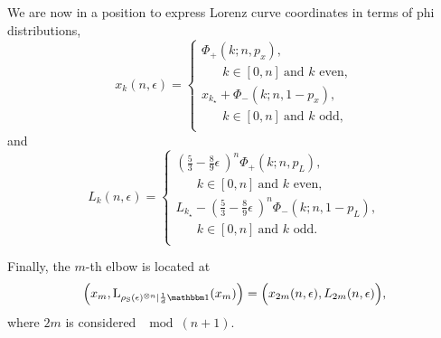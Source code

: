 \documentclass[pra,
aps,
twocolumn,
superscriptaddress,
groupedaddress,
nofootinbib,
reprint
]{revtex4-1}
\begin{document}
We are now in a position to express Lorenz curve coordinates in terms of phi distributions,
\begin{equation}\label{x_coord_elb}
	x_k(n, \epsilon) = 
	\begin{cases}
		\Phi_+(k;n,p_x),\\
		\hspace{20pt} k\in[0,n]\ \text{and }k\text{ even}, \\
		x_{k_\star} + \Phi_-(k;n,1-p_x),\\
		\hspace{20pt} k\in[0,n]\ \text{and }k\text{ odd}, \\
	\end{cases}	
\end{equation}
and
\begin{equation}\label{lc_coord_elb}
	L_k(n, \epsilon) = 
	\begin{cases}
		\left( \frac{5}{3} - \frac{8}{9}\epsilon\ \right)^n \Phi_+(k;n,p_L),\\
		\hspace{20pt} k\in[0,n]\ \text{and }k\text{ even}, \\
		L_{k_\star} - \left( \frac{5}{3} - \frac{8}{9}\epsilon\ \right)^n\Phi_-(k;n,1-p_L),\\
		\hspace{20pt} k\in[0,n]\ \text{and }k\text{ odd}. \\
	\end{cases}	
\end{equation}

Finally, the $m$-th elbow is located at
\begin{equation}\label{eq:lcsu_elbows}
	\left(x_m, \lc{\noisysn}{\frac{1}{d}\id}(x_m) \right) = \Big( x_{2m}(n, \epsilon), L_{2m}(n, \epsilon) \Big),
\end{equation}
where $2m$ is considered \hspace{-7pt}$\mod{(n+1)}$.
\end{document}
